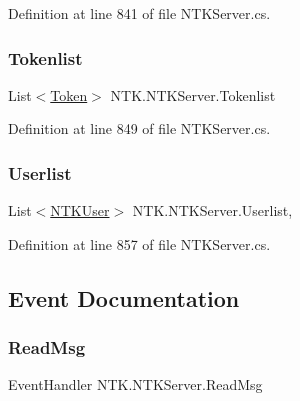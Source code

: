Definition at line 841 of file N\+T\+K\+Server.\+cs.

\mbox{\label{class_n_t_k_1_1_n_t_k_server_adc563330fa6178c43c1f411b8c8ca536}} 
\subsubsection{\texorpdfstring{Tokenlist}{Tokenlist}}
{\footnotesize\ttfamily List$<$\mbox{\hyperlink{class_n_t_k_1_1_other_1_1_token}{Token}}$>$ N\+T\+K.\+N\+T\+K\+Server.\+Tokenlist\hspace{0.3cm}{\ttfamily [get]}}







Definition at line 849 of file N\+T\+K\+Server.\+cs.

\mbox{\label{class_n_t_k_1_1_n_t_k_server_ae483c2086cbfb5995a3784af3a28917e}} 
\subsubsection{\texorpdfstring{Userlist}{Userlist}}
{\footnotesize\ttfamily List$<$\mbox{\hyperlink{class_n_t_k_1_1_n_t_k_user}{N\+T\+K\+User}}$>$ N\+T\+K.\+N\+T\+K\+Server.\+Userlist\hspace{0.3cm}{\ttfamily [get]}, {\ttfamily [set]}}







Definition at line 857 of file N\+T\+K\+Server.\+cs.



\subsection{Event Documentation}
\mbox{\label{class_n_t_k_1_1_n_t_k_server_a2261cd274407c3c06daa569c09f5119a}} 
\subsubsection{\texorpdfstring{ReadMsg}{ReadMsg}}
{\footnotesize\ttfamily Event\+Handler N\+T\+K.\+N\+T\+K\+Server.\+Read\+Msg}



